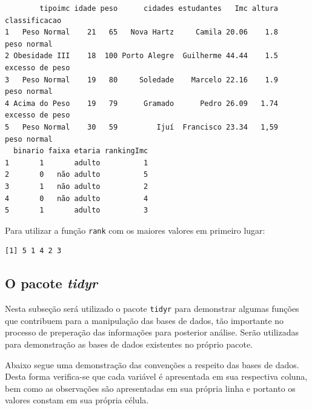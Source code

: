 \documentclass[12pt,brazil,oneside]{book}
\newenvironment{Shaded}{\begin{snugshade}}{\end{snugshade}}
\newcommand{\KeywordTok}[1]{\textcolor[rgb]{0.13,0.29,0.53}{\textbf{#1}}}
\newcommand{\NormalTok}[1]{#1}
\newcommand{\OperatorTok}[1]{\textcolor[rgb]{0.81,0.36,0.00}{\textbf{#1}}}
\begin{document}
\begin{Shaded}
\end{Shaded}

\begin{verbatim}
        tipoimc idade peso      cidades estudantes   Imc altura   classificacao
1   Peso Normal    21   65   Nova Hartz     Camila 20.06    1.8     peso normal
2 Obesidade III    18  100 Porto Alegre  Guilherme 44.44    1.5 excesso de peso
3   Peso Normal    19   80     Soledade    Marcelo 22.16    1.9     peso normal
4 Acima do Peso    19   79      Gramado      Pedro 26.09   1.74 excesso de peso
5   Peso Normal    30   59         Ijuí  Francisco 23.34   1,59     peso normal
  binario faixa etaria rankingImc
1       1       adulto          1
2       0   não adulto          5
3       1   não adulto          2
4       0   não adulto          4
5       1       adulto          3
\end{verbatim}

Para utilizar a função \texttt{rank} com os maiores valores em primeiro lugar:

\begin{Shaded}
\end{Shaded}

\begin{verbatim}
[1] 5 1 4 2 3
\end{verbatim}

\hypertarget{o-pacote-tidyr}{%
\subsection{\texorpdfstring{O pacote \emph{tidyr}}{O pacote tidyr}}\label{o-pacote-tidyr}}

Nesta subseção será utilizado o pacote \texttt{tidyr} para demonstrar algumas funções que contribuem para a manipulação das bases de dados, tão importante no processo de preperação das informações para posterior análise. Serão utilizadas para demonstração as bases de dados existentes no próprio pacote.

Abaixo segue uma demonstração das convenções a respeito das bases de dados. Desta forma verifica-se que cada variável é apresentada em sua respectiva coluna, bem como as observações são apresentadas em sua própria linha e portanto os valores constam em sua própria célula.
\end{document}
